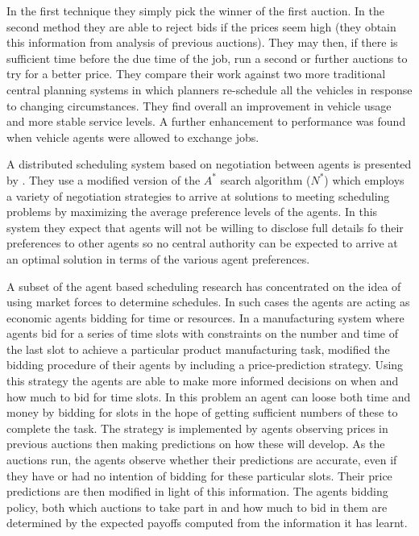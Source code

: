 In the first technique they simply pick the winner of the first auction. In the second method they are able to reject bids if the prices seem high (they obtain this information from analysis of previous auctions). They may then, if there is sufficient time before the due time of the job, run a second or further auctions to try for a better price. 
They compare their work against two more traditional central planning systems in which planners re-schedule all the vehicles in response to changing circumstances. They find overall an improvement in vehicle usage and more stable service levels. A further enhancement to performance was found when vehicle agents were allowed to exchange jobs.

A distributed scheduling system based on negotiation between agents is presented by \citet{chun03nstar}. They use a modified version of the $A^*$ search algorithm ($N^*$) which employs a variety of negotiation strategies to arrive at solutions to meeting scheduling problems by maximizing the average preference levels of the agents. In this system they expect that agents will not be willing to disclose full details fo their preferences to other agents so no central authority can be expected to arrive at an optimal solution in terms of the various agent preferences.

A subset of the agent based scheduling research has concentrated on the idea of using market forces to determine schedules. In such cases the agents are acting as economic agents bidding for time or resources. In a manufacturing system where agents bid for a series of time slots with constraints on the number and time of the last slot to achieve a particular product manufacturing task, \citet{mackie04price} modified the bidding procedure of their agents by including a price-prediction strategy. Using this strategy the agents are able to make more informed decisions on when and how much to bid for time slots. In this problem an agent can loose both time and money by bidding for slots in the hope of getting sufficient numbers of these to complete the task. The strategy is implemented by agents observing prices in previous auctions then making predictions on how these will develop. As the auctions run, the agents observe whether their predictions are accurate, even if they have or had no intention of bidding for these particular slots. Their price predictions are then modified in light of this information. The agents bidding policy, both which auctions to take part in and how much to bid in them are determined by the expected payoffs computed from the information it has learnt. 


